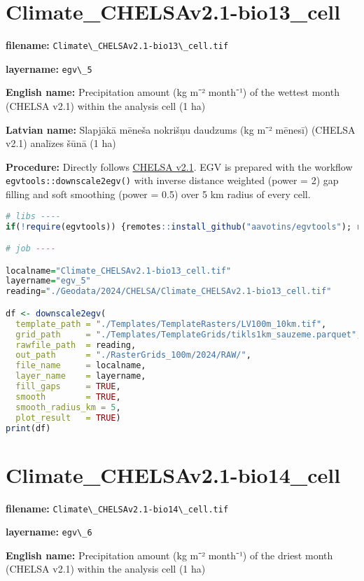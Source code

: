 \documentclass[
]{book}
\newcommand{\passthrough}[1]{#1}
\begin{document}
\section{Climate\_CHELSAv2.1-bio13\_cell}\label{ch06.005}

\textbf{filename:} \passthrough{\lstinline!Climate\_CHELSAv2.1-bio13\_cell.tif!}

\textbf{layername:} \passthrough{\lstinline!egv\_5!}

\textbf{English name:} Precipitation amount (kg m⁻² month⁻¹) of the wettest month (CHELSA v2.1) within the analysis cell (1 ha)

\textbf{Latvian name:} Slapjākā mēneša nokrišņu daudzums (kg m⁻² mēnesī) (CHELSA v2.1) analīzes šūnā (1 ha)

\textbf{Procedure:} Directly follows \hyperref[Ch04.11]{CHELSA v2.1}. EGV is prepared with the
workflow \passthrough{\lstinline!egvtools::downscale2egv()!} with inverse distance weighted (power = 2)
gap filling and soft smoothing (power = 0.5) over 5 km radius of every cell.

\begin{lstlisting}[language=R]
# libs ----
if(!require(egvtools)) {remotes::install_github("aavotins/egvtools"); require(egvtools)}

# job ----

localname="Climate_CHELSAv2.1-bio13_cell.tif"
layername="egv_5"
reading="./Geodata/2024/CHELSA/Climate_CHELSAv2.1-bio13_cell.tif"

df <- downscale2egv(
  template_path = "./Templates/TemplateRasters/LV100m_10km.tif",
  grid_path     = "./Templates/TemplateGrids/tikls1km_sauzeme.parquet",
  rawfile_path  = reading,
  out_path      = "./RasterGrids_100m/2024/RAW/",
  file_name     = localname,
  layer_name    = layername,
  fill_gaps     = TRUE,
  smooth        = TRUE,
  smooth_radius_km = 5,
  plot_result   = TRUE)
print(df)
\end{lstlisting}

\section{Climate\_CHELSAv2.1-bio14\_cell}\label{ch06.006}

\textbf{filename:} \passthrough{\lstinline!Climate\_CHELSAv2.1-bio14\_cell.tif!}

\textbf{layername:} \passthrough{\lstinline!egv\_6!}

\textbf{English name:} Precipitation amount (kg m⁻² month⁻¹) of the driest month (CHELSA v2.1) within the analysis cell (1 ha)
\end{document}
